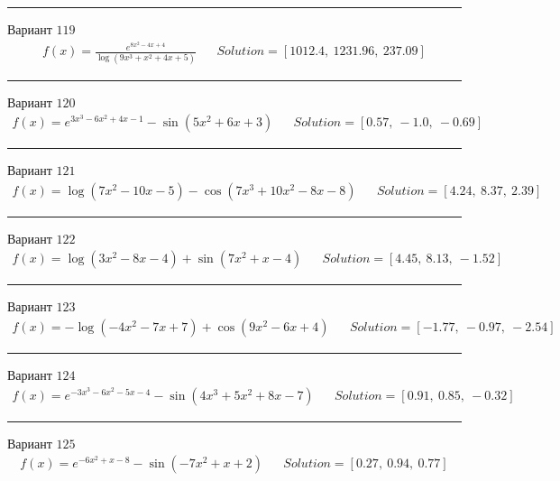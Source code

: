 \documentclass[11pt]{report}
\begin{document}
\begin{center}
    \noindent\rule{8cm}{0.4pt}
\end{center}
Вариант \(119\)
\begin{align*}
    f(x) = \frac{e^{8 x^{2} - 4 x + 4}}{\log{\left(9 x^{3} + x^{2} + 4 x + 5 \right)}} && Solution = \left[ 1012.4, \  1231.96, \  237.09\right]
\end{align*}
\begin{center}
    \noindent\rule{8cm}{0.4pt}
\end{center}
Вариант \(120\)
\begin{align*}
    f(x) = e^{3 x^{3} - 6 x^{2} + 4 x - 1} - \sin{\left(5 x^{2} + 6 x + 3 \right)} && Solution = \left[ 0.57, \  -1.0, \  -0.69\right]
\end{align*}
\begin{center}
    \noindent\rule{8cm}{0.4pt}
\end{center}
Вариант \(121\)
\begin{align*}
    f(x) = \log{\left(7 x^{2} - 10 x - 5 \right)} - \cos{\left(7 x^{3} + 10 x^{2} - 8 x - 8 \right)} && Solution = \left[ 4.24, \  8.37, \  2.39\right]
\end{align*}
\begin{center}
    \noindent\rule{8cm}{0.4pt}
\end{center}
Вариант \(122\)
\begin{align*}
    f(x) = \log{\left(3 x^{2} - 8 x - 4 \right)} + \sin{\left(7 x^{2} + x - 4 \right)} && Solution = \left[ 4.45, \  8.13, \  -1.52\right]
\end{align*}
\begin{center}
    \noindent\rule{8cm}{0.4pt}
\end{center}
Вариант \(123\)
\begin{align*}
    f(x) = - \log{\left(- 4 x^{2} - 7 x + 7 \right)} + \cos{\left(9 x^{2} - 6 x + 4 \right)} && Solution = \left[ -1.77, \  -0.97, \  -2.54\right]
\end{align*}
\begin{center}
    \noindent\rule{8cm}{0.4pt}
\end{center}
Вариант \(124\)
\begin{align*}
    f(x) = e^{- 3 x^{3} - 6 x^{2} - 5 x - 4} - \sin{\left(4 x^{3} + 5 x^{2} + 8 x - 7 \right)} && Solution = \left[ 0.91, \  0.85, \  -0.32\right]
\end{align*}
\begin{center}
    \noindent\rule{8cm}{0.4pt}
\end{center}
Вариант \(125\)
\begin{align*}
    f(x) = e^{- 6 x^{2} + x - 8} - \sin{\left(- 7 x^{2} + x + 2 \right)} && Solution = \left[ 0.27, \  0.94, \  0.77\right]
\end{align*}
\end{document}
